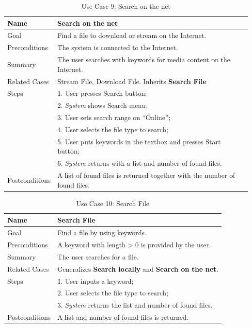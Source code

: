 \begin{table}[h!]
\centering
\begin{tabular}{|l|l|}
\hline
Name & Search on the net\\ \hline
Goal & Find a file to download or stream on the Internet.\\ \hline
Preconditions & The system is connected to the Internet. \\ \hline
Summary & The user searches with keywords for media content on the Internet.\\ \hline

Related Cases & Stream File, Download File. Inherits \textbf{Search File} \\ \hline
Steps &  1. User presses Search button; \\
      &  2. \textit{System} shows Search menu; \\
      &  3. User sets search range on ``Online''; \\
      &  4. User selects the file type to search; \\
      &  5. User puts keywords in the textbox and presses Start button; \\
      &  6. \textit{System} returns with a list and number of found files. 
        \\ \hline
Postconditions & A list of found files is returned together with the number of found files.
\\ \hline
\end{tabular}
\caption{Use Case 9: Search on the net}
\label{tab:UC9}
\end{table}

\begin{table}[h!]
\centering
\begin{tabular}{|l|l|}
\hline
Name & Search File\\ \hline
Goal & Find a file by using keywords.\\ \hline
Preconditions & A keyword with length > 0 is provided by the user. \\ \hline
Summary & The user searches for a file.\\ \hline
Related Cases & Generalizes \textbf{Search locally} and \textbf{Search on the net}. \\ \hline
Steps &  1. User inputs a keyword; \\
      &  2. User selects the file type to search; \\
      &  3. \textit{System} returns the list and number of found files. 
        \\ \hline
Postconditions & A list and number of found files is returned.
\\ \hline
\end{tabular}
\caption{Use Case 10: Search File}
\label{tab:UC10}
\end{table}

